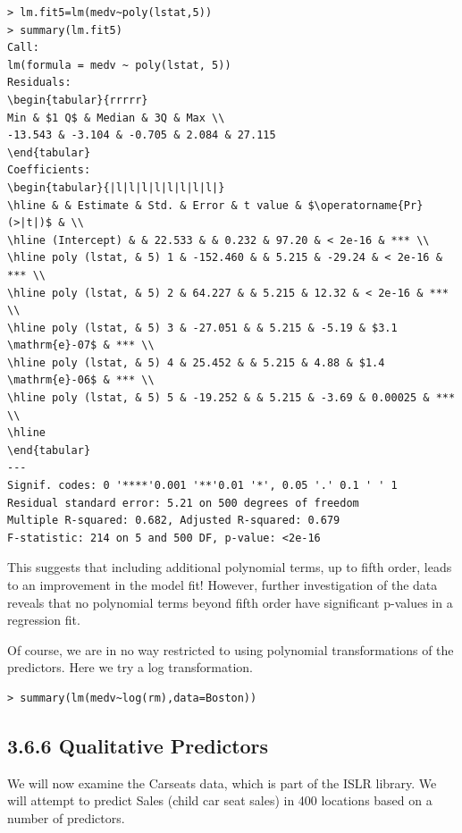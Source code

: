 \documentclass[10pt]{article}
\begin{document}
\begin{verbatim}
> lm.fit5=lm(medv~poly(lstat,5))
> summary(lm.fit5)
Call:
lm(formula = medv ~ poly(lstat, 5))
Residuals:
\begin{tabular}{rrrrr} 
Min & $1 Q$ & Median & 3Q & Max \\
-13.543 & -3.104 & -0.705 & 2.084 & 27.115
\end{tabular}
Coefficients:
\begin{tabular}{|l|l|l|l|l|l|l|l|}
\hline & & Estimate & Std. & Error & t value & $\operatorname{Pr}(>|t|)$ & \\
\hline (Intercept) & & 22.533 & & 0.232 & 97.20 & < 2e-16 & *** \\
\hline poly (lstat, & 5) 1 & -152.460 & & 5.215 & -29.24 & < 2e-16 & *** \\
\hline poly (lstat, & 5) 2 & 64.227 & & 5.215 & 12.32 & < 2e-16 & *** \\
\hline poly (lstat, & 5) 3 & -27.051 & & 5.215 & -5.19 & $3.1 \mathrm{e}-07$ & *** \\
\hline poly (lstat, & 5) 4 & 25.452 & & 5.215 & 4.88 & $1.4 \mathrm{e}-06$ & *** \\
\hline poly (lstat, & 5) 5 & -19.252 & & 5.215 & -3.69 & 0.00025 & *** \\
\hline
\end{tabular}
---
Signif. codes: 0 '****'0.001 '**'0.01 '*', 0.05 '.' 0.1 ' ' 1
Residual standard error: 5.21 on 500 degrees of freedom
Multiple R-squared: 0.682, Adjusted R-squared: 0.679
F-statistic: 214 on 5 and 500 DF, p-value: <2e-16
\end{verbatim}

This suggests that including additional polynomial terms, up to fifth order, leads to an improvement in the model fit! However, further investigation of the data reveals that no polynomial terms beyond fifth order have significant p-values in a regression fit.

Of course, we are in no way restricted to using polynomial transformations of the predictors. Here we try a log transformation.

\begin{verbatim}
> summary(lm(medv~log(rm),data=Boston))
\end{verbatim}

\subsection*{3.6.6 Qualitative Predictors}
We will now examine the Carseats data, which is part of the ISLR library. We will attempt to predict Sales (child car seat sales) in 400 locations based on a number of predictors.
\end{document}
